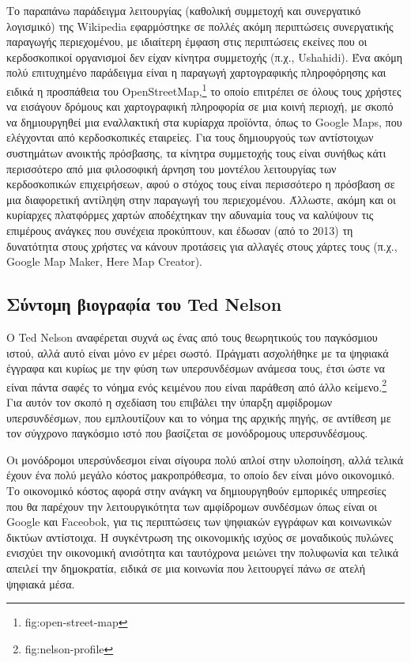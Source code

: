 \documentclass[
]{article}
\begin{document}
Το παραπάνω παράδειγμα λειτουργίας (καθολική συμμετοχή και συνεργατικό
λογισμικό) της Wikipedia εφαρμόστηκε σε πολλές ακόμη περιπτώσεις
συνεργατικής παραγωγής περιεχομένου, με ιδιαίτερη έμφαση στις
περιπτώσεις εκείνες που οι κερδοσκοπικοί οργανισμοί δεν είχαν κίνητρα
συμμετοχής (π.χ., Ushahidi). Ένα ακόμη πολύ επιτυχημένο παράδειγμα είναι
η παραγωγή χαρτογραφικής πληροφόρησης και ειδικά η προσπάθεια του
OpenStreetMap,\footnote{fig:open-street-map} το οποίο επιτρέπει σε όλους
τους χρήστες να εισάγουν δρόμους και χαρτογραφική πληροφορία σε μια
κοινή περιοχή, με σκοπό να δημιουργηθεί μια εναλλακτική στα κυρίαρχα
προϊόντα, όπως το Google Maps, που ελέγχονται από κερδοσκοπικές
εταιρείες. Για τους δημιουργούς των αντίστοιχων συστημάτων ανοικτής
πρόσβασης, τα κίνητρα συμμετοχής τους είναι συνήθως κάτι περισσότερο από
μια φιλοσοφική άρνηση του μοντέλου λειτουργίας των κερδοσκοπικών
επιχειρήσεων, αφού ο στόχος τους είναι περισσότερο η πρόσβαση σε μια
διαφορετική αντίληψη στην παραγωγή του περιεχομένου. Άλλωστε, ακόμη και
οι κυρίαρχες πλατφόρμες χαρτών αποδέχτηκαν την αδυναμία τους να καλύψουν
τις επιμέρους ανάγκες που συνέχεια προκύπτουν, και έδωσαν (από το 2013)
τη δυνατότητα στους χρήστες να κάνουν προτάσεις για αλλαγές στους χάρτες
τους (π.χ., Google Map Maker, Here Map Creator).

\hypertarget{ux3c3ux3cdux3bdux3c4ux3bfux3bcux3b7-ux3b2ux3b9ux3bfux3b3ux3c1ux3b1ux3c6ux3afux3b1-ux3c4ux3bfux3c5-ted-nelson}{%
\subsection{Σύντομη βιογραφία του Ted
Nelson}\label{ux3c3ux3cdux3bdux3c4ux3bfux3bcux3b7-ux3b2ux3b9ux3bfux3b3ux3c1ux3b1ux3c6ux3afux3b1-ux3c4ux3bfux3c5-ted-nelson}}

O Ted Nelson αναφέρεται συχνά ως ένας από τους θεωρητικούς του
παγκόσμιου ιστού, αλλά αυτό είναι μόνο εν μέρει σωστό. Πράγματι
ασχολήθηκε με τα ψηφιακά έγγραφα και κυρίως με την φύση των
υπερσυνδέσμων ανάμεσα τους, έτσι ώστε να είναι πάντα σαφές το νόημα ενός
κειμένου που είναι παράθεση από άλλο κείμενο.\footnote{fig:nelson-profile}
Για αυτόν τον σκοπό η σχεδίαση του επιβάλει την ύπαρξη αμφίδρομων
υπερσυνδέσμων, που εμπλουτίζουν και το νόημα της αρχικής πηγής, σε
αντίθεση με τον σύγχρονο παγκόσμιο ιστό που βασίζεται σε μονόδρομους
υπερσυνδέσμους.

Οι μονόδρομοι υπερσύνδεσμοι είναι σίγουρα πολύ απλοί στην υλοποίηση,
αλλά τελικά έχουν ένα πολύ μεγάλο κόστος μακροπρόθεσμα, το οποίο δεν
είναι μόνο οικονομικό. Το οικονομικό κόστος αφορά στην ανάγκη να
δημιουργηθούν εμπορικές υπηρεσίες που θα παρέχουν την λειτουργικότητα
των αμφίδρομων συνδέσμων όπως είναι οι Google και Faceobok, για τις
περιπτώσεις των ψηφιακών εγγράφων και κοινωνικών δικτύων αντίστοιχα. Η
συγκέντρωση της οικονομικής ισχύος σε μοναδικούς πυλώνες ενισχύει την
οικονομική ανισότητα και ταυτόχρονα μειώνει την πολυφωνία και τελικά
απειλεί την δημοκρατία, ειδικά σε μια κοινωνία που λειτουργεί πάνω σε
ατελή ψηφιακά μέσα.
\end{document}
